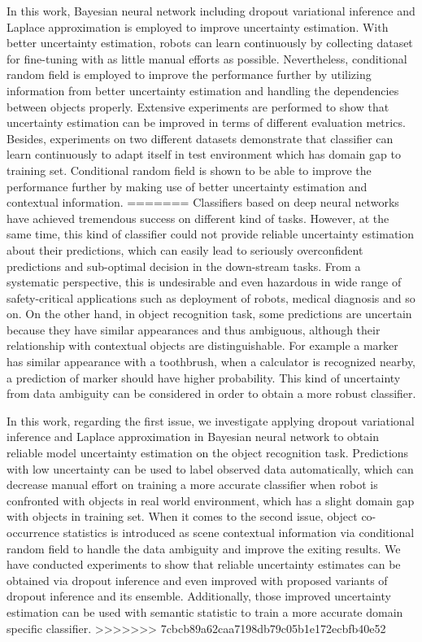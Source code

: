 In this work, Bayesian neural network including dropout variational inference and Laplace approximation is employed to improve uncertainty estimation. With better uncertainty estimation, robots can learn continuously by collecting dataset for fine-tuning with as little manual efforts as possible. Nevertheless, conditional random field is employed to improve the performance further by utilizing information from better uncertainty estimation and handling the dependencies between objects properly. Extensive experiments are performed to show that uncertainty estimation can be improved in terms of different evaluation metrics. Besides, experiments on two different datasets demonstrate that classifier can learn continuously to adapt itself in test environment which has domain gap to training set. Conditional random field is shown to be able to improve the performance further by making use of better uncertainty estimation and contextual information.
=======
Classifiers based on deep neural networks have achieved tremendous success on different kind of tasks. However, at the same time, this kind of classifier could not provide reliable uncertainty estimation about their predictions, which can easily lead to seriously overconfident predictions and sub-optimal decision in the down-stream tasks. From a systematic perspective, this is undesirable and even hazardous in wide range of safety-critical applications such as deployment of robots, medical diagnosis and so on. On the other hand, in object recognition task, some predictions are uncertain because they have similar appearances and thus ambiguous, although their relationship with contextual objects are distinguishable. For example a marker has similar appearance with a toothbrush, when a calculator is recognized nearby, a prediction of marker should have higher probability. This kind of uncertainty from data ambiguity can be considered in order to obtain a more robust classifier.  

In this work, regarding the first issue, we investigate applying dropout variational inference and Laplace approximation in Bayesian neural network to obtain reliable model uncertainty estimation on the object recognition task. Predictions with low uncertainty can be used to label observed data automatically, which can decrease manual effort on training a more accurate classifier when robot is confronted with objects in real world environment, which has a slight domain gap with objects in training set. When it comes to the second issue, object co-occurrence statistics is introduced as scene contextual information via conditional random field to handle the data ambiguity and improve the exiting results. We have conducted experiments to show that reliable uncertainty estimates can be obtained via dropout inference and even improved with proposed variants of dropout inference and its ensemble. Additionally, those improved uncertainty estimation can be used with semantic statistic to train a more accurate domain specific classifier.
>>>>>>> 7cbcb89a62caa7198db79c05b1e172ecbfb40e52

\switchlanguage{\lang} %
